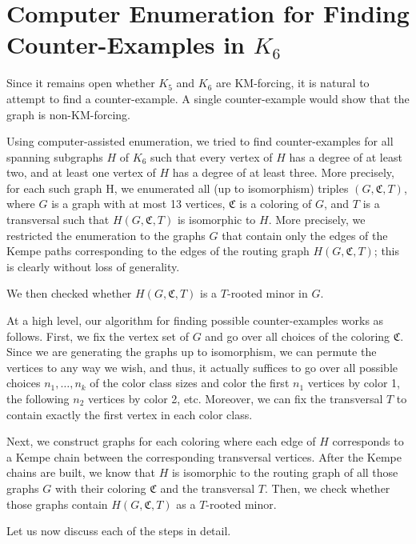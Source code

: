 \chapter{Computer Enumeration for Finding Counter-Examples in \( K_6 \)}
\label{chap:enumeration}

Since it remains open whether \( K_5 \) and \( K_6 \) are KM-forcing, it is natural to attempt to find a counter-example.
A single counter-example would show that the graph is non-KM-forcing.

Using computer-assisted enumeration, we tried to find counter-examples for all spanning subgraphs $H$ of $K_6$ such that 
every vertex of $H$ has a degree of at least two, and at least one vertex of $H$ has a degree of at least three.
More precisely, for each such graph H, we enumerated all (up to isomorphism) triples $(G,\mathfrak{C}, T)$, where $G$ is
a graph with at most 13 vertices, $\mathfrak{C}$ is a coloring of $G$, and $T$ is a transversal such that $H(G,\mathfrak{C}, T)$ is isomorphic
to $H$. More precisely, we restricted the enumeration to the graphs $G$ that contain only the edges of the
Kempe paths corresponding to the edges of the routing graph $H(G,\mathfrak{C}, T)$; this is clearly without loss of generality.

We then checked whether \( H(G, \mathfrak{C}, T) \) is a $T$-rooted minor in $G$.

At a high level, our algorithm for finding possible counter-examples works as follows.
First, we fix the vertex set of $G$ and go over all
choices of the coloring $\mathfrak{C}$. Since we are generating the graphs up
to isomorphism, we can permute the vertices to any
 way we wish, and thus, it actually suffices to go over all possible
choices $n_1, \dots, n_k$ of the color class sizes and color the first $n_1$ vertices 
by color 1, the following $n_2$ vertices by color 2, etc. Moreover, we
can fix the transversal $T$ to contain exactly the first vertex in each color class.

Next, we construct graphs for each coloring where each edge of $H$ corresponds to a Kempe chain between the corresponding transversal vertices. After the Kempe chains are built, 
we know that \( H \) is isomorphic to the routing graph of all those graphs $G$ with their coloring $\mathfrak{C}$ and the transversal $T$. 
Then, we check whether those graphs contain $H(G, \mathfrak{C}, T)$ as a $T$-rooted minor. 

Let us now discuss each of the steps in detail.

